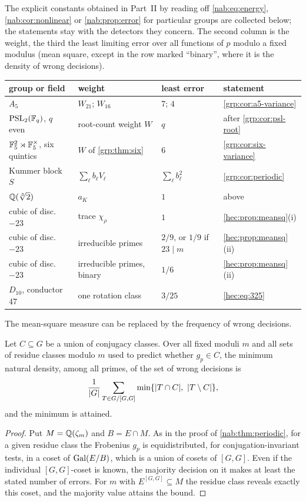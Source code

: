 The explicit constants obtained in Part~II by reading off \eqref{nab:eq:energy},
\cref{nab:cor:nonlinear} or \cref{nab:prop:error} for particular groups are collected
below; the statements stay with the detectors they concern. The second column is the
weight, the third the least limiting error over all functions of $p$ modulo a fixed
modulus (mean square, except in the row marked ``binary'', where it is the density of
wrong decisions).
\begin{center}\small
\begin{tabular}{@{}llll@{}}\toprule
group or field & weight & least error & statement\\\midrule
$A_5$ & $W_{21}$; $W_{16}$ & $7$; $4$ & \cref{grp:cor:a5-variance}\\
$\operatorname{PSL}_2(\mathbb{F}_q)$, $q$ even & root-count weight $W$ & $q$ & after \cref{grp:cor:psl-root}\\
$\mathbb{F}_5^2\rtimes\mathbb{F}_5^\times$, six quintics & $W$ of \cref{grp:thm:six} & $6$ &
 \cref{grp:cor:six-variance}\\
Kummer block $S$ & $\sum_\ell b_\ell V_\ell$ & $\sum_\ell b_\ell^2$ & \cref{grp:cor:periodic}\\
$\mathbb{Q}(\sqrt[3]2)$ & $a_K$ & $1$ & above\\
cubic of disc.\ $-23$ & trace $\chi_\rho$ & $1$ & \cref{hec:prop:meansq}(i)\\
cubic of disc.\ $-23$ & irreducible primes & $2/9$, or $1/9$ if $23\mid m$ &
 \cref{hec:prop:meansq}(ii)\\
cubic of disc.\ $-23$ & irreducible primes, binary & $1/6$ & \cref{hec:prop:meansq}(ii)\\
$D_{10}$, conductor $47$ & one rotation class & $3/25$ & \eqref{hec:eq:325}\\\bottomrule
\end{tabular}
\end{center}

The mean-square measure can be replaced by the frequency of wrong decisions.

\begin{proposition}\label{nab:prop:error}
Let $C\subseteq G$ be a union of conjugacy classes. Over all fixed moduli $m$ and all sets
of residue classes modulo $m$ used to predict whether $g_p\in C$, the minimum natural
density, among all primes, of the set of wrong decisions is
\[
 \frac1{\lvert G\rvert}\sum_{T\in G/[G,G]}\min\{\lvert T\cap C\rvert,\ \lvert T\setminus C\rvert\},
\]
and the minimum is attained.
\end{proposition}
\begin{proof}
Put $M=\mathbb{Q}(\zeta_m)$ and $B=E\cap M$. As in the proof of \cref{nab:thm:periodic}, for a
given residue class the Frobenius $g_p$ is equidistributed, for conjugation-invariant
tests, in a coset of $\operatorname{Gal}(E/B)$, which is a union of cosets of $[G,G]$. Even if the
individual $[G,G]$-coset is known, the majority decision on it makes at least the stated
number of errors. For $m$ with $E^{[G,G]}\subseteq M$ the residue class reveals exactly
this coset, and the majority value attains the bound.
\end{proof}

